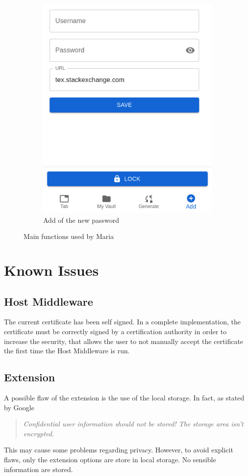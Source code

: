 \begin{enumerate}
\begin{figure}[H]
\begin{subfigure}{.5\textwidth}
			\includegraphics[width=.6\linewidth]{images/extension/add.png}
			\caption{Add of the new password}
			\label{fig:sub22}
		\end{subfigure}
		\caption{Main functions used by Maria}
		\label{fig:tes2t}
	\end{figure}
\end{enumerate}


\section{Known Issues}
\label{sec:know_issues}

\subsection{Host Middleware}
The current certificate has been self signed. In a complete implementation, the certificate must be correctly signed by a certification authority in order to increase the security, that allows the user to not manually accept the certificate the first time the Host Middleware is run.


\subsection{Extension}
\label{sec:extension}
A possible flaw of the extension is the use of the local storage. In fact, as stated by Google
\begin{quote}
    \textit{    Confidential user information should not be stored! The storage area isn't encrypted.
    }
\end{quote}
This may cause some problems regarding privacy. However, to avoid explicit flaws, only the extension options are store in local storage. No sensible information are stored.
